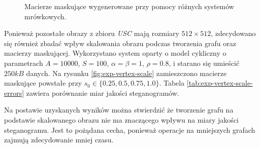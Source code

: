 {\begin{figure}
        \caption[Porównania wizualizacji konwersji oraz macierzy maskujących.]
        {
            Macierze maskujące wygenerowane przy pomocy różnych systemów mrówkowych.
        }
        \label{fig:exp-vertex-pher}
    \end{figure}

    Ponieważ pozostałe obrazy z zbioru \textit{USC} mają rozmiary $512 \times 512$, zdecydowano się również zbadać wpływ
    skalowania obrazu podczas tworzenia grafu oraz macierzy maskującej. Wykorzystano system oparty o model cykliczny o
    parametrach $A=10000$, $S=100$, $\alpha=\beta=1$, $\rho=0.8$, i starano się umieścić $250kB$ danych. Na rysunku
    \ref{fig:exp-vertex-scale} zamieszczono macierze maskujące powstałe przy $s_0 \in \{0.25, 0.5, 0.75, 1.0\}$. Tabela
    \ref{tab:exp-vertex-scale-errors} zawiera porównanie miar jakości steganogramów.

    Na postawie uzyskanych wyników można stwierdzić że tworzenie grafu na podstawie skalowanego obrazu nie ma znaczącego
    wpływu na miary jakości steganogramu. Jest to pożądana cecha, ponieważ operacje na mniejszych grafach zajmują
    zdecydowanie mniej czasu.

}
